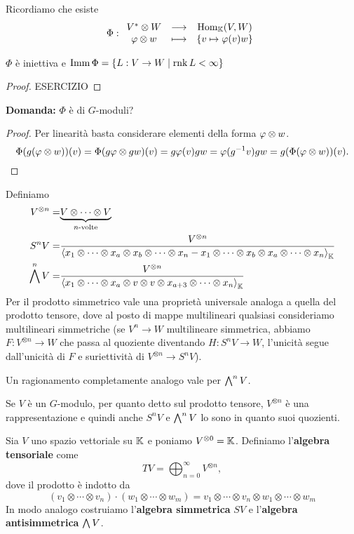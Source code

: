 Ricordiamo che esiste
\[\Phi:\begin{array}{ccc} {V^\ast\otimes W} & \longrightarrow & {\operatorname{Hom}_{\mathbb{K}}(V,W)}\\ {\varphi\otimes w} & \longmapsto & {\left\{{v\mapsto \varphi(v)w}\right\}} \end{array}\]
\begin{remark}
$\Phi$ \`e iniettiva e $\operatorname{Imm} \Phi=\left\{{L:V\to W\mid \operatorname{rnk} L<\infty}\right\}$
\end{remark}
\begin{proof}
ESERCIZIO
\end{proof}

\textbf{Domanda:} $\Phi$ \`e di $G$-moduli?
\begin{proof}
Per linearit\`a basta considerare elementi della forma $\varphi\otimes w$.
\[\Phi(g(\varphi\otimes w))(v)=\Phi(g\varphi\otimes gw)(v)=g\varphi(v)gw=\varphi(g^{-1} v)gw=g(\Phi(\varphi\otimes w))(v).\]
\end{proof}

\begin{definition}
Definiamo
\begin{align*}
V^{\otimes n}=&\underset{n\text{-volte}}{\underbrace{V\otimes\cdots\otimes V}}\\
S^nV=&\frac{V^{\otimes n}}{\left\langle {x_1\otimes\cdots\otimes x_a\otimes x_b\otimes\cdots\otimes x_n-x_1\otimes\cdots\otimes x_b\otimes x_a\otimes\cdots\otimes x_n}\right\rangle_{\mathbb{K}}}\\
\bigwedge^nV=&\frac{V^{\otimes n}}{\left\langle {x_1\otimes\cdots\otimes x_a\otimes v\otimes v\otimes x_{a+3}\otimes\cdots\otimes x_n}\right\rangle_{\mathbb{K}}}
\end{align*}
Per il prodotto simmetrico vale una propriet\`a universale analoga a quella del prodotto tensore, dove al posto di mappe multilineari qualsiasi consideriamo multilineari simmetriche (se $V^n\to W$ multilineare simmetrica, abbiamo $F:V^{\otimes n}\to W$ che passa al quoziente diventando $H:S^nV\to W$, l'unicit\`a segue dall'unicit\`a di $F$ e suriettivit\`a di $V^{\otimes n}\to S^nV$).

Un ragionamento completamente analogo vale per $\bigwedge^nV$.
\end{definition}

\begin{remark}
Se $V$ \`e un $G$-modulo, per quanto detto sul prodotto tensore, $V^{\otimes n}$ \`e una rappresentazione e quindi anche $S^nV$ e $\bigwedge^n V$ lo sono in quanto suoi quozienti.
\end{remark}


\begin{definition}
Sia $V$ uno spazio vettoriale su $\mathbb{K}$ e poniamo $V^{\otimes 0}=\mathbb{K}$. Definiamo l'\textbf{algebra tensoriale} come
\[TV=\bigoplus_{n=0}^\infty V^{\otimes n},\]
dove il prodotto \`e indotto da
\[(v_1\otimes\cdots\otimes v_n)\cdot(w_1\otimes\cdots\otimes w_m)=v_1\otimes\cdots\otimes v_n\otimes w_1\otimes\cdots\otimes w_m\]
In modo analogo costruiamo l'\textbf{algebra simmetrica} $SV$ e l'\textbf{algebra antisimmetrica} $\bigwedge V$.
\end{definition}

